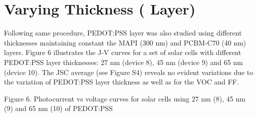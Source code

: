 \section{Varying  Thickness ( Layer)}




Following same procedure, PEDOT:PSS layer was also studied using different thicknesses maintaining constant the MAPI (300 nm) and PCBM-C70 (40 nm) layers.
Figure 6 illustrates the J-V curves for a set of solar cells with different PEDOT:PSS layer thicknesses: 27 nm (device 8), 45 nm (device 9) and 65 nm (device 10). The JSC average (see Figure S4) reveals no evident variations due to the variation of PEDOT:PSS layer thickness as well as for the VOC and FF.

Figure 6. Photocurrent vs voltage curves for solar cells using 27 nm (8), 45 nm (9) and 65 nm (10) of PEDOT:PSS 


